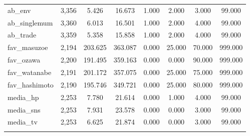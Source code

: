 \begin{table}[!htbp]
\begin{tabular}{@{\extracolsep{5pt}}lccccccc}
ab\_env & 3,356 & 5.426 & 16.673 & 1.000 & 2.000 & 3.000 & 99.000 \\ 
ab\_singlemum & 3,360 & 6.013 & 16.501 & 1.000 & 2.000 & 4.000 & 99.000 \\ 
ab\_trade & 3,359 & 5.358 & 15.858 & 1.000 & 2.000 & 4.000 & 99.000 \\ 
fav\_masuzoe & 2,194 & 203.625 & 363.087 & 0.000 & 25.000 & 70.000 & 999.000 \\ 
fav\_ozawa & 2,200 & 191.495 & 359.163 & 0.000 & 0.000 & 90.000 & 999.000 \\ 
fav\_watanabe & 2,191 & 201.172 & 357.075 & 0.000 & 25.000 & 75.000 & 999.000 \\ 
fav\_hashimoto & 2,190 & 195.746 & 349.721 & 0.000 & 25.000 & 80.000 & 999.000 \\ 
media\_hp & 2,253 & 7.780 & 21.614 & 0.000 & 1.000 & 4.000 & 99.000 \\ 
media\_sns & 2,253 & 7.931 & 23.578 & 0.000 & 0.000 & 3.000 & 99.000 \\ 
media\_tv & 2,253 & 6.625 & 21.874 & 0.000 & 0.000 & 3.000 & 99.000 \\ 
\hline \\[-1.8ex] 
\end{tabular} 
\end{table} 
